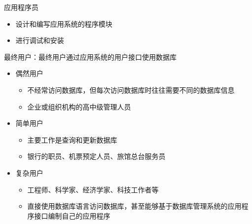 应用程序员
\vspace{-0.8em}
\begin{multicols}{2}
    \begin{itemize}
        \item 设计和编写应用系统的程序模块
        \item 进行调试和安装
    \end{itemize}
\end{multicols}
\vspace{-1em}


最终用户：最终用户通过应用系统的用户接口使用数据库
\begin{itemize}
    \item 偶然用户
    \begin{itemize}
        \item 不经常访问数据库，但每次访问数据库时往往需要不同的数据库信息 
        \item 企业或组织机构的高中级管理人员
    \end{itemize}
    \item 简单用户
    \begin{itemize}
        \item 主要工作是查询和更新数据库
        \item 银行的职员、机票预定人员、旅馆总台服务员
    \end{itemize}
    \item 复杂用户
    \begin{itemize}
        \item 工程师、科学家、经济学家、科技工作者等
        \item 直接使用数据库语言访问数据库，甚至能够基于数据库管理系统的应用程序接口编制自己的应用程序
    \end{itemize}
\end{itemize}

